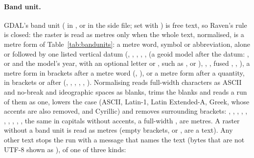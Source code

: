 \paragraph{Band unit.} GDAL's band unit ( in , or  in the side file;
set with ) is free text, so Raven's rule is closed: the raster is read as metres only when the
whole text, normalised, is a metre form of Table~\ref{tab:bandunits}: a metre word, symbol or abbreviation, alone or followed
by one listed vertical datum (, , , , ,
 (a geoid model after the datum: , or  and the model's year, with an optional letter  or , such as ,  or ), , , fused , , ), a metre form in brackets after a metre word (,
), or a metre form after a quantity, in brackets or after  (,
, , , , ). Normalising reads full-width characters as
ASCII and no-break and ideographic spaces as blanks, trims the blanks and reads a run of them as one, lowers the case (ASCII,
Latin-1, Latin Extended-A, Greek, whose accents are also removed, and Cyrillic) and removes surrounding brackets: ,
, , \cmd{[metres]}, , , , , ,
\cmd{$\mu\acute{\epsilon}\tau\rho\alpha$}, the same in capitals without accents, a full-width ,  are
metres. A raster without a band unit is read as metres (empty brackets, \cmd{()} or \cmd{[]}, are a text). Any other text
stops the run with a message that names the text (bytes that are not UTF-8 shown as ), of one of
three kinds:
